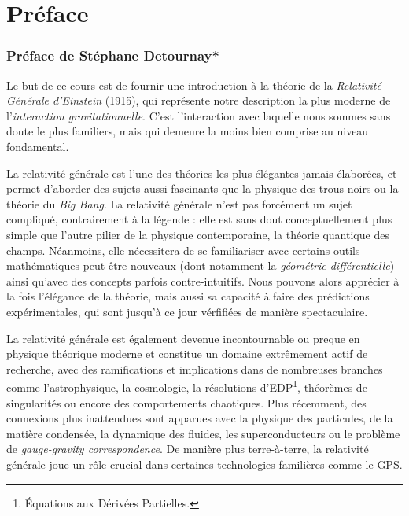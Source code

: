 \section*{Préface}

\subsubsection{Préface de Stéphane Detournay*}
Le but de ce cours est de fournir une introduction à la théorie de la \emph{Relativité Générale d'Einstein} (1915), qui représente notre description la plus moderne de l'\emph{interaction gravitationnelle}. C'est l'interaction avec laquelle nous sommes sans doute le plus familiers, mais qui demeure la moins bien comprise au niveau fondamental.

La relativité générale est l'une des théories les plus élégantes jamais élaborées, et permet d'aborder des sujets aussi fascinants que la physique des trous noirs ou la théorie du \emph{Big Bang}. La relativité générale n'est pas forcément un sujet compliqué, contrairement à la légende : elle est sans dout conceptuellement plus simple que l'autre pilier de la physique contemporaine, la théorie quantique des champs. Néanmoins, elle nécessitera de se familiariser avec certains outils mathématiques peut-être nouveaux (dont notamment la \emph{géométrie différentielle}) ainsi qu'avec des concepts parfois contre-intuitifs. Nous pouvons alors apprécier à la fois l'élégance de la théorie, mais aussi sa capacité à faire des prédictions expérimentales, qui sont jusqu'à ce jour vérfifiées de manière spectaculaire.

La relativité générale est également devenue incontournable ou preque en physique théorique moderne et constitue un domaine extrêmement actif de recherche, avec des ramifications et implications dans de nombreuses branches comme l'astrophysique, la cosmologie, la résolutions d'EDP\footnote{Équations aux Dérivées Partielles.}, théorèmes de singularités ou encore des comportements chaotiques. Plus récemment, des connexions plus inattendues sont apparues avec la physique des particules, de la matière condensée, la dynamique des fluides, les superconducteurs ou le problème de \emph{gauge-gravity correspondence}. De manière plus terre-à-terre, la relativité générale joue un rôle crucial dans certaines technologies familières comme le GPS. 

